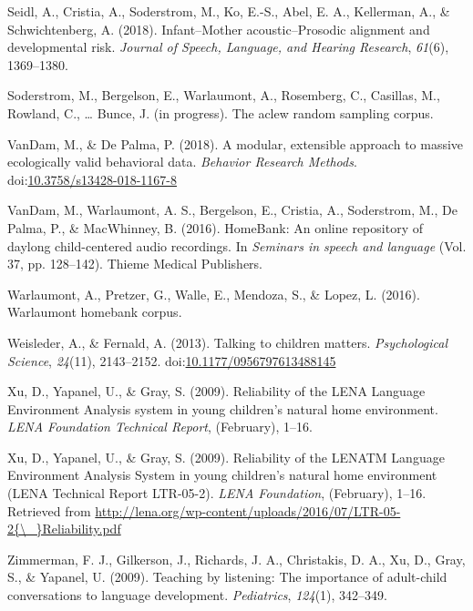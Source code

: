 \documentclass[english,floatsintext,man]{apa6}
\begin{document}
\hypertarget{ref-Seidl2018}{}
Seidl, A., Cristia, A., Soderstrom, M., Ko, E.-S., Abel, E. A.,
Kellerman, A., \& Schwichtenberg, A. (2018). Infant--Mother
acoustic--Prosodic alignment and developmental risk. \emph{Journal of
Speech, Language, and Hearing Research}, \emph{61}(6), 1369--1380.

\hypertarget{ref-soderstrom}{}
Soderstrom, M., Bergelson, E., Warlaumont, A., Rosemberg, C., Casillas,
M., Rowland, C., \ldots{} Bunce, J. (in progress). The aclew random
sampling corpus.

\hypertarget{ref-VanDam2018}{}
VanDam, M., \& De Palma, P. (2018). A modular, extensible approach to
massive ecologically valid behavioral data. \emph{Behavior Research
Methods}.
doi:\href{https://doi.org/10.3758/s13428-018-1167-8}{10.3758/s13428-018-1167-8}

\hypertarget{ref-vandam2016homebank}{}
VanDam, M., Warlaumont, A. S., Bergelson, E., Cristia, A., Soderstrom,
M., De Palma, P., \& MacWhinney, B. (2016). HomeBank: An online
repository of daylong child-centered audio recordings. In \emph{Seminars
in speech and language} (Vol. 37, pp. 128--142). Thieme Medical
Publishers.

\hypertarget{ref-warlaumont2016warlaumont}{}
Warlaumont, A., Pretzer, G., Walle, E., Mendoza, S., \& Lopez, L.
(2016). Warlaumont homebank corpus.

\hypertarget{ref-Weisleder2013a}{}
Weisleder, A., \& Fernald, A. (2013). Talking to children matters.
\emph{Psychological Science}, \emph{24}(11), 2143--2152.
doi:\href{https://doi.org/10.1177/0956797613488145}{10.1177/0956797613488145}

\hypertarget{ref-Xu2009}{}
Xu, D., Yapanel, U., \& Gray, S. (2009). Reliability of the LENA
Language Environment Analysis system in young children's natural home
environment. \emph{LENA Foundation Technical Report}, (February), 1--16.

\hypertarget{ref-Xu2009a}{}
Xu, D., Yapanel, U., \& Gray, S. (2009). Reliability of the LENATM
Language Environment Analysis System in young children's natural home
environment (LENA Technical Report LTR-05-2). \emph{LENA Foundation},
(February), 1--16. Retrieved from
\href{http://lena.org/wp-content/uploads/2016/07/LTR-05-2\%7B/_\%7DReliability.pdf}{http://lena.org/wp-content/uploads/2016/07/LTR-05-2\{\textbackslash{}\_\}Reliability.pdf}

\hypertarget{ref-zimmerman2009}{}
Zimmerman, F. J., Gilkerson, J., Richards, J. A., Christakis, D. A., Xu,
D., Gray, S., \& Yapanel, U. (2009). Teaching by listening: The
importance of adult-child conversations to language development.
\emph{Pediatrics}, \emph{124}(1), 342--349.
\end{document}
